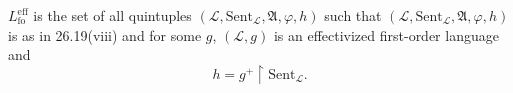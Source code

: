 $L_{\mathrm{fo}}^{\mathrm{eff}}$ is the set of all quintuples $(\mathcal{L}, \mathrm{Sent}_{\mathcal{L}}, \mathfrak{A}, \varphi, h)$ such that $(\mathcal{L}, \mathrm{Sent}_{\mathcal{L}}, \mathfrak{A}, \varphi, h)$ is as in 26.19(viii) and for some $g$, $(\mathcal{L}, g)$ is an effectivized first-order language and
$$h = g^{+} \upharpoonright \mathrm{Sent}_{\mathcal{L}}.$$
